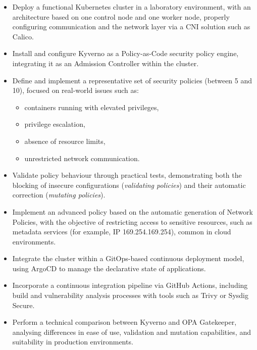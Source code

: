 \begin{itemize}
    \item Deploy a functional Kubernetes cluster in a laboratory environment, with an architecture based on one control node and one worker node, properly configuring communication and the network layer via a CNI solution such as Calico.

    \item Install and configure Kyverno as a Policy-as-Code security policy engine, integrating it as an Admission Controller within the cluster.

    \item Define and implement a representative set of security policies (between 5 and 10), focused on real-world issues such as:
    \begin{itemize}
        \item containers running with elevated privileges,
        \item privilege escalation,
        \item absence of resource limits,
        \item unrestricted network communication.
    \end{itemize}

    \item Validate policy behaviour through practical tests, demonstrating both the blocking of insecure configurations (\textit{validating policies}) and their automatic correction (\textit{mutating policies}).

    \item Implement an advanced policy based on the automatic generation of Network Policies, with the objective of restricting access to sensitive resources, such as metadata services (for example, IP 169.254.169.254), common in cloud environments.

    \item Integrate the cluster within a GitOps-based continuous deployment model, using ArgoCD to manage the declarative state of applications.

    \item Incorporate a continuous integration pipeline via GitHub Actions, including build and vulnerability analysis processes with tools such as Trivy or Sysdig Secure.

    \item Perform a technical comparison between Kyverno and OPA Gatekeeper, analysing differences in ease of use, validation and mutation capabilities, and suitability in production environments.
\end{itemize}


